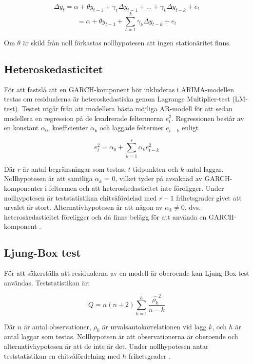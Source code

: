 \documentclass[11pt]{article}
\numberwithin{equation}{section}
\numberwithin{table}{section}
\numberwithin{figure}{section}
\begin{document}
\begin{equation}
    \Delta y_t = \alpha + \theta y_{t-1} + \gamma_1\Delta y_{t-1} + ... + \gamma_k\Delta y_{t-k} + e_t
\end{equation}
\begin{equation}
        = \alpha + \theta y_{t-1} + \sum_{t=1}^{k}\gamma_k \Delta y_{t-k} + e_t
\end{equation}

Om \(\theta\) är skild från noll förkastas nollhypotesen att ingen stationäritet finns.

\subsection{Heteroskedasticitet}

För att fastslå att en GARCH-komponent bör inkluderas i ARIMA-modellen testas om residualerna är heteroskedastiska genom Lagrange Multiplier-test (LM-test). Testet utgår från att modellera bästa möjliga AR-modell för att sedan modellera en regression på de kvadrerade feltermerna \(e_t^2\). Regressionen består av en konstant \(\alpha_0\), koefficienter $\alpha_k$ och laggade feltermer $e_{t-k}$ enligt

\begin{equation}
    e_t^2=\alpha_0+\sum_{k=1}^{r}\alpha_k e_{t-k}^2
\end{equation}

Där $r$ är antal begränsningar som testas, $t$ tidpunkten och $k$ antal laggar. Nollhypotesen är att samtliga \(\alpha_k\) = 0, vilket tyder på avsaknad av GARCH-komponenter i feltermen och att heteroskedasticitet inte föreligger. Under nollhypotesen är teststatistikan chitvåfördelad med $r-1$ frihetsgrader givet att urvalet är stort. Alternativhypotesen är att någon av $\alpha_k \neq 0$, dvs. heteroskedasticitet föreligger och då finns belägg för att använda en GARCH-komponent \parencite{engle1982autoregressive}. 

\subsection{Ljung-Box test}
För att säkerställa att residualerna av en modell är oberoende kan Ljung-Box test användas. Teststatistikan är:

\begin{equation}
    Q = n(n+2)\sum_{k=1}^{h}\frac{\hat{\rho_k}^2}{n-k}
\end{equation}

Där $n$ är antal observationer, $\rho_k$ är urvalsautokorrelationen vid lagg $k$, och $h$ är antal laggar som testas. Nollhypotsen är att observationerna är oberoende och alternativhypotesen är att de inte är det. Under nollhypotesen antar teststatistikan en chitvåfördelning med $h$ frihetsgrader \parencite{box1970distribution}.
\end{document}
